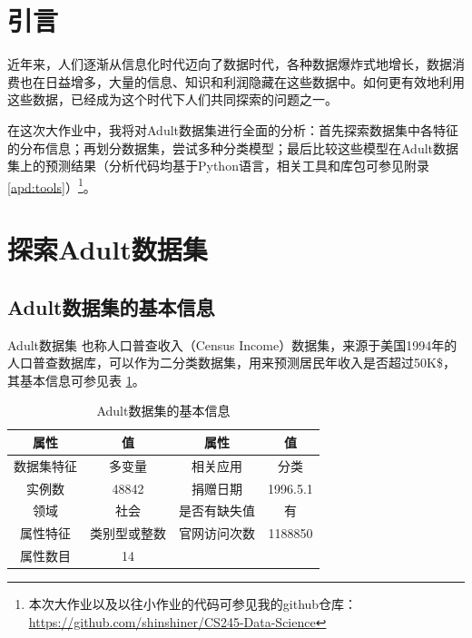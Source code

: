 \documentclass[12pt,a4paper]{article}
\theoremstyle{definition}
\begin{document}
\section{引言}

近年来，人们逐渐从信息化时代迈向了数据时代，各种数据爆炸式地增长，数据消费也在日益增多，大量的信息、知识和利润隐藏在这些数据中。如何更有效地利用这些数据，已经成为这个时代下人们共同探索的问题之一。

\vspace{0.01\linewidth}
在这次大作业中，我将对Adult数据集进行全面的分析：首先探索数据集中各特征的分布信息；再划分数据集，尝试多种分类模型；最后比较这些模型在Adult数据集上的预测结果（分析代码均基于Python语言，相关工具和库包可参见附录 \ref{apd:tools}）\footnote{本次大作业以及以往小作业的代码可参见我的github仓库：\href{https://github.com/shinshiner/CS245-Data-Science}{https://github.com/shinshiner/CS245-Data-Science}}。

\section{探索Adult数据集}

\subsection{Adult数据集的基本信息}

Adult数据集 \cite{Dataset} 也称人口普查收入（Census Income）数据集，来源于美国1994年的人口普查数据库，可以作为二分类数据集，用来预测居民年收入是否超过50K\$，其基本信息可参见表 \ref{tab:basic-info}。

\begin{table}[H]
	\renewcommand\arraystretch{1.35}
	\caption{Adult数据集的基本信息}
	\label{tab:basic-info}
	\centering
	
	\begin{tabular}{c|c||c|c}
		\centering
		属性 & 值 & 属性 & 值 \\
		\hline
		\hline
		数据集特征 & 多变量 & 相关应用 & 分类 \\
		实例数 & 48842 & 捐赠日期 & 1996.5.1 \\
		领域 & 社会 & 是否有缺失值 & 有 \\
		属性特征 & 类别型或整数 & 官网访问次数 & 1188850 \\
		属性数目 & 14 & & \\
		
	\end{tabular}
\end{table}
\end{document}
